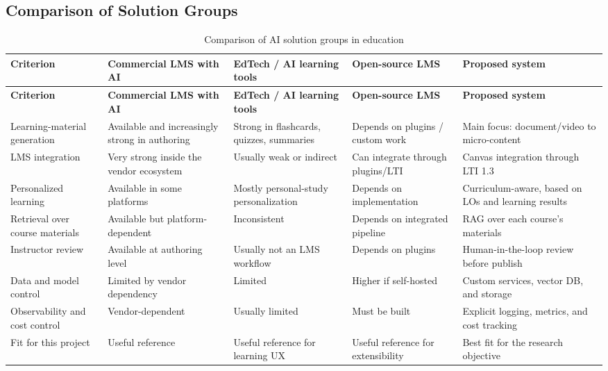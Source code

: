 \subsection{Comparison of Solution Groups}

\begingroup
\footnotesize
\setlength{\tabcolsep}{3pt}
\begin{longtable}{|p{2.4cm}|p{2.9cm}|p{3cm}|p{2.8cm}|p{3cm}|}
\caption{Comparison of AI solution groups in education}
\label{tab:so-sanh-giai-phap-ai-giao-duc}\\
\hline
\textbf{Criterion} & \textbf{Commercial LMS with AI} & \textbf{EdTech / AI learning tools} & \textbf{Open-source LMS} & \textbf{Proposed system} \\
\hline
\endfirsthead
\hline
\textbf{Criterion} & \textbf{Commercial LMS with AI} & \textbf{EdTech / AI learning tools} & \textbf{Open-source LMS} & \textbf{Proposed system} \\
\hline
\endhead
Learning-material generation & Available and increasingly strong in authoring & Strong in flashcards, quizzes, summaries & Depends on plugins / custom work & Main focus: document/video to micro-content \\
\hline
LMS integration & Very strong inside the vendor ecosystem & Usually weak or indirect & Can integrate through plugins/LTI & Canvas integration through LTI 1.3 \\
\hline
Personalized learning & Available in some platforms & Mostly personal-study personalization & Depends on implementation & Curriculum-aware, based on LOs and learning results \\
\hline
Retrieval over course materials & Available but platform-dependent & Inconsistent & Depends on integrated pipeline & RAG over each course's materials \\
\hline
Instructor review & Available at authoring level & Usually not an LMS workflow & Depends on plugins & Human-in-the-loop review before publish \\
\hline
Data and model control & Limited by vendor dependency & Limited & Higher if self-hosted & Custom services, vector DB, and storage \\
\hline
Observability and cost control & Vendor-dependent & Usually limited & Must be built & Explicit logging, metrics, and cost tracking \\
\hline
Fit for this project & Useful reference & Useful reference for learning UX & Useful reference for extensibility & Best fit for the research objective \\
\hline
\end{longtable}
\endgroup

